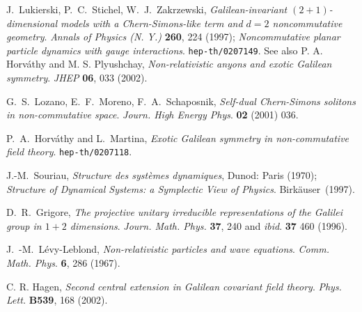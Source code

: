 \documentclass[a4paper,11pt]{article}
\begin{document}
\begin{thebibliography}{99}
   J.~Lukierski, P.~C.~Stichel, W.~J.~Zakrzewski,
    {\it Galilean-invariant $(2+1)$-dimensional models with a
      Chern-Simons-like term and $d=2$ noncommutative geometry}.
   {\sl Annals of Physics (N. Y.)} {\bf 260}, 224 (1997);
   {\it Noncommutative planar particle dynamics with gauge
    interactions}. \texttt{hep-th/0207149}. See also
   P. A. Horv\'athy and M. S. Plyushchay,
   {\it Non-relativistic anyons and exotic Galilean symmetry}.
   {\sl JHEP} {\bf 06}, 033 (2002). %

G.~S.~Lozano, E.~F.~Moreno, F.~A.~Schaposnik,
  {\it Self-dual Chern-Simons solitons in non-commutative space}.
{\sl Journ. High Energy Phys}. {\bf 02} (2001) 036.

P.~A.~Horv\'athy and L.~Martina,
{\it Exotic Galilean symmetry in non-commutative field theory}.
\texttt{hep-th/0207118}.


J.-M.~Souriau,
{\it Structure des syst\`emes dynamiques},
Dunod: Paris (1970);
{\it Structure of Dynamical Systems: a Symplectic View of Physics}.
Birk\"auser~(1997).

D.~R.~Grigore,
   {\it The projective unitary irreducible representations of the
    Galilei group in $1+2$ dimensions}.
   {\sl Journ. Math. Phys.} {\bf 37}, 240 and
   {\sl ibid}. {\bf 37} 460 (1996).

J.~-M.~L\'evy-Leblond,
{\it Non-relativistic particles and wave equations}.
{\sl Comm. Math. Phys}. {\bf 6}, 286 (1967).

C. R. Hagen,
{\it Second central extension in Galilean covariant field theory}.
{\sl Phys. Lett.} {\bf B539}, 168 (2002).


\end{thebibliography}
\end{document}

